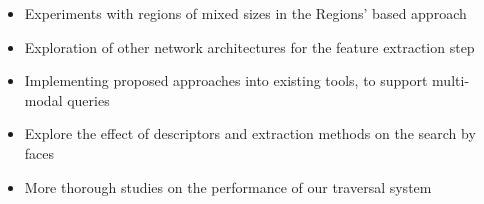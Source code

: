 \begin{itemize}
    \item Experiments with regions of mixed sizes in the Regions' based approach
    \item Exploration of other network architectures for the feature extraction step
    \item Implementing proposed approaches into existing tools, to support multi-modal queries
    \item Explore the effect of descriptors and extraction methods on the search by faces
    \item More thorough studies on the performance of our traversal system
\end{itemize}


